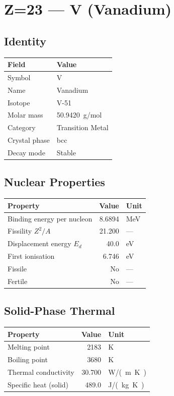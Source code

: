 \documentclass[11pt,a4paper]{article}
\begin{document}
\newpage

\section{Z=23 --- V (Vanadium)}
\label{sec:Z23}

\subsection{Identity}
\begin{tabular}{ll}
  \toprule
  Field & Value \\
  \midrule
  Symbol & V \\
  Name & Vanadium \\
  Isotope & V-51 \\
  Molar mass & \SI{50.9420}{g/mol} \\
  Category & Transition Metal \\
  Crystal phase & bcc \\
  Decay mode & Stable \\
  \bottomrule
\end{tabular}

\subsection{Nuclear Properties}
\begin{tabular}{lrl}
  \toprule
  Property & Value & Unit \\
  \midrule
  Binding energy per nucleon & 8.6894 & \si{MeV} \\
  Fissility $Z^2/A$ & 21.200 & --- \\
  Displacement energy $E_d$ & 40.0 & \si{eV} \\
  First ionisation & 6.746 & \si{eV} \\
  Fissile & No & --- \\
  Fertile & No & --- \\
  \bottomrule
\end{tabular}

\subsection{Solid-Phase Thermal}
\begin{tabular}{lrl}
  \toprule
  Property & Value & Unit \\
  \midrule
  Melting point & 2183 & \si{K} \\
  Boiling point & 3680 & \si{K} \\
  Thermal conductivity & 30.700 & \si{W/(m.K)} \\
  Specific heat (solid) & 489.0 & \si{J/(kg.K)} \\
  \bottomrule
\end{tabular}
\end{document}
